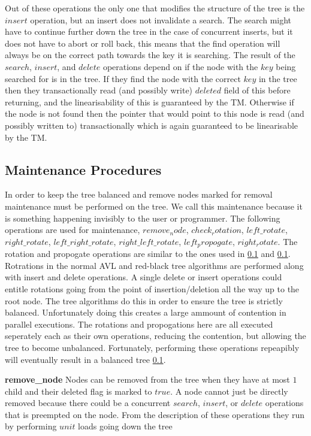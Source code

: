 \documentclass[10pt]{sigplanconf}
\begin{document}
Out of these operations the only one that modifies the structure of the tree is the $insert$ operation, but an insert does not invalidate a search.
The search might have to continue further down the tree in the case of concurrent inserts, but it does not have to abort or roll back, this means that the find operation will always be on the correct path towards the key it is searching.
The result of the $search$, $insert$, and $delete$ operations depend on if the node with the $key$ being searched for is in the tree.
If they find the node with the correct $key$ in the tree then they transactionally read (and possibly write) $deleted$ field of this before returning, and the linearisability of this is guaranteed by the TM.
Otherwise if the node is not found then the pointer that would point to this node is read (and possibly written to) transactionally which is again guaranteed to be linearisable by the TM.

\subsection{Maintenance Procedures}
In order to keep the tree balanced and remove nodes marked for removal maintenance must be performed on the tree.
We call this maintenance because it is something happening invisibly to the user or programmer.
The following operations are used for maintenance, $remove_node$, $check_rotation$, $left\_rotate$, $right\_rotate$, $left\_right\_rotate$, $right\_left\_rotate$, $left_propogate$, $right_rotate$.
The rotation and propogate operations are similar to the ones used in \ref{} and \ref{}.
Rotrations in the normal AVL and red-black tree algorithms are performed along with insert and delete operations.
A single delete or insert operations could entitle rotations going from the point of insertion/deletion all the way up to the root node.
The tree algorithms do this in order to ensure the tree is strictly balanced.
Unfortunately doing this creates a large ammount of contention in parallel executions.
The rotations and propogations here are all executed seperately each as their own operations, reducing the contention, but allowing the tree to become unbalanced.
Fortunately, performing these operations repeapibly will eventually result in a balanced tree \ref{}.

{\bf remove\_node} Nodes can be removed from the tree when they have at most $1$ child and their deleted flag is marked to $true$.
A node cannot just be directly removed because there could be a concurrent $search$, $insert$, or $delete$ operations that is preempted on the node.
From the description of these operations they run by performing $unit$ loads going down the tree 
\end{document}
